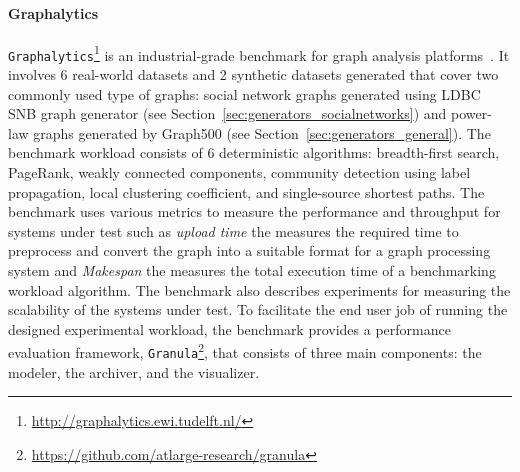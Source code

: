\paragraph{Graphalytics} \texttt{Graphalytics}\footnote{\url{http://graphalytics.ewi.tudelft.nl/}} is an industrial-grade benchmark for graph analysis platforms~\cite{Iosup:2016:LGB:3007263.3007270}. It involves 6 real-world datasets and 2 synthetic datasets generated that cover two commonly used type of graphs: social network graphs generated using LDBC SNB graph generator (see Section~\ref{sec:generators_socialnetworks}) and power-law graphs generated by Graph500 (see Section~\ref{sec:generators_general}). The benchmark workload consists of 6 deterministic algorithms: breadth-first search, PageRank, weakly connected components, community detection using label propagation, local clustering coefficient, and single-source shortest paths. The benchmark uses various metrics to measure the performance and throughput for systems under test such as \emph{upload time} the measures the required time to preprocess and convert the graph into a suitable format for a graph processing system and \emph{Makespan} the measures the total  execution time of a benchmarking workload algorithm. The benchmark also describes experiments for measuring the scalability of the systems under test. To facilitate the end user job of running the designed experimental workload, the benchmark provides  a performance evaluation framework, \texttt{Granula}\footnote{\url{https://github.com/atlarge-research/granula}}, that consists of three main components: the modeler, the archiver, and the visualizer.



